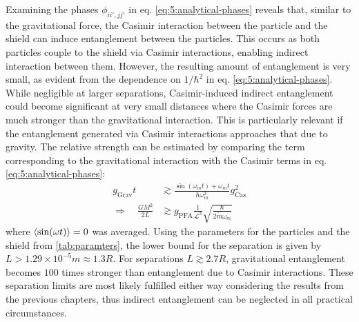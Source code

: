 Examining the phases $\phi_{ii',jj'}$ in eq. \eqref{eq:5:analytical-phases} reveals that, similar to the gravitational force, the Casimir interaction between the particle and the shield can induce entanglement between the particles. This occurs as both particles couple to the shield via Casimir interactions, enabling indirect interaction between them.
However, the resulting amount of entanglement is very small, as evident from the dependence on $1/\hbar^2$ in eq. \eqref{eq:5:analytical-phases}.
While negligible at larger separations, Casimir-induced indirect entanglement could become significant at very small distances where the Casimir forces are much stronger than the gravitational interaction. 
This is particularly relevant if the entanglement generated via Casimir interactions approaches that due to gravity. 
The relative strength can be estimated by comparing the term corresponding to the gravitational interaction with the Casimir terms in eq. \eqref{eq:5:analytical-phases}:
\begin{align}
  g_\mathrm{Grav} t &\gtrsim \frac{\sin(\omega_m t) + \omega_m t}{\hbar \omega_m^2} g_\mathrm{Cas}^2 \\
  \Longrightarrow \quad 
  \frac{G M^2}{2L} &\gtrsim g_\mathrm{PFA} \frac{1}{\mathscr{L}^3} \sqrt{\frac{\hbar}{2\tilde{m}\omega_m}}
\end{align}
where $\left\langle\sin(\omega t)\right\rangle = 0$ was averaged.
Using the parameters for the particles and the shield from \cref{tab:paramters}, the lower bound for the separation is given by $L > 1.29\times 10^{-5}\si{m}\approx 1.3 R$. For separations $L \gtrsim 2.7R$, gravitational entanglement becomes $100$ times stronger than entanglement due to Casimir interactions.
These separation limits are most likely fulfilled either way considering the results from the previous chapters, thus indirect entanglement can be neglected in all practical circumstances.



